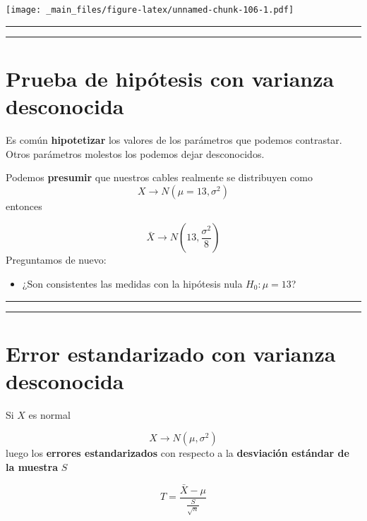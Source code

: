 \documentclass[
]{book}
\providecommand{\tightlist}{%
  \setlength{\itemsep}{0pt}\setlength{\parskip}{0pt}}
\begin{document}
\texttt{[image: \_main\_files/figure-latex/unnamed-chunk-106-1.pdf]}

\begin{center}\rule{0.5\linewidth}{0.5pt}\end{center}

\begin{center}\rule{0.5\linewidth}{0.5pt}\end{center}

\hypertarget{prueba-de-hipuxf3tesis-con-varianza-desconocida}{%
\section{Prueba de hipótesis con varianza desconocida}\label{prueba-de-hipuxf3tesis-con-varianza-desconocida}}

Es común \textbf{hipotetizar} los valores de los parámetros que podemos contrastar. Otros parámetros molestos los podemos dejar desconocidos.

Podemos \textbf{presumir} que nuestros cables realmente se distribuyen como \[X \rightarrow N(\mu=13, \sigma^2)\] entonces

\[\bar{X} \rightarrow N(13, \frac{\sigma^2}{8})\]
Preguntamos de nuevo:

\begin{itemize}
\tightlist
\item
  ¿Son consistentes las medidas con la hipótesis nula \(H_0: \mu=13\)?
\end{itemize}

\begin{center}\rule{0.5\linewidth}{0.5pt}\end{center}

\begin{center}\rule{0.5\linewidth}{0.5pt}\end{center}

\hypertarget{error-estandarizado-con-varianza-desconocida}{%
\section{Error estandarizado con varianza desconocida}\label{error-estandarizado-con-varianza-desconocida}}

Si \(X\) es normal

\[X \rightarrow N(\mu, \sigma^2)\] luego los \textbf{errores estandarizados} con respecto a la \textbf{desviación estándar de la muestra} \(S\)

\[T=\frac{\bar{X}-\mu}{\frac{S}{\sqrt{n}}}\]
\end{document}
